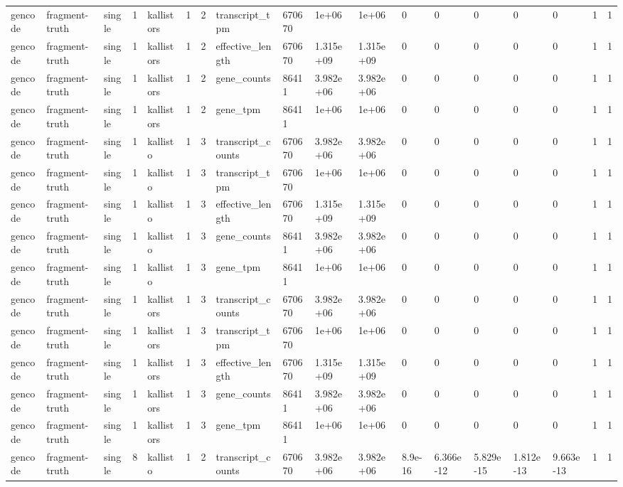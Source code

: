 \begin{tabular}{llllllllllllllllll}
gencode & fragment-truth & single & 1 & kallistors & 1 & 2 & transcript\_tpm & 670670 & 1e+06 & 1e+06 & 0 & 0 & 0 & 0 & 0 & 1 & 1 \\
gencode & fragment-truth & single & 1 & kallistors & 1 & 2 & effective\_length & 670670 & 1.315e+09 & 1.315e+09 & 0 & 0 & 0 & 0 & 0 & 1 & 1 \\
gencode & fragment-truth & single & 1 & kallistors & 1 & 2 & gene\_counts & 86411 & 3.982e+06 & 3.982e+06 & 0 & 0 & 0 & 0 & 0 & 1 & 1 \\
gencode & fragment-truth & single & 1 & kallistors & 1 & 2 & gene\_tpm & 86411 & 1e+06 & 1e+06 & 0 & 0 & 0 & 0 & 0 & 1 & 1 \\
gencode & fragment-truth & single & 1 & kallisto & 1 & 3 & transcript\_counts & 670670 & 3.982e+06 & 3.982e+06 & 0 & 0 & 0 & 0 & 0 & 1 & 1 \\
gencode & fragment-truth & single & 1 & kallisto & 1 & 3 & transcript\_tpm & 670670 & 1e+06 & 1e+06 & 0 & 0 & 0 & 0 & 0 & 1 & 1 \\
gencode & fragment-truth & single & 1 & kallisto & 1 & 3 & effective\_length & 670670 & 1.315e+09 & 1.315e+09 & 0 & 0 & 0 & 0 & 0 & 1 & 1 \\
gencode & fragment-truth & single & 1 & kallisto & 1 & 3 & gene\_counts & 86411 & 3.982e+06 & 3.982e+06 & 0 & 0 & 0 & 0 & 0 & 1 & 1 \\
gencode & fragment-truth & single & 1 & kallisto & 1 & 3 & gene\_tpm & 86411 & 1e+06 & 1e+06 & 0 & 0 & 0 & 0 & 0 & 1 & 1 \\
gencode & fragment-truth & single & 1 & kallistors & 1 & 3 & transcript\_counts & 670670 & 3.982e+06 & 3.982e+06 & 0 & 0 & 0 & 0 & 0 & 1 & 1 \\
gencode & fragment-truth & single & 1 & kallistors & 1 & 3 & transcript\_tpm & 670670 & 1e+06 & 1e+06 & 0 & 0 & 0 & 0 & 0 & 1 & 1 \\
gencode & fragment-truth & single & 1 & kallistors & 1 & 3 & effective\_length & 670670 & 1.315e+09 & 1.315e+09 & 0 & 0 & 0 & 0 & 0 & 1 & 1 \\
gencode & fragment-truth & single & 1 & kallistors & 1 & 3 & gene\_counts & 86411 & 3.982e+06 & 3.982e+06 & 0 & 0 & 0 & 0 & 0 & 1 & 1 \\
gencode & fragment-truth & single & 1 & kallistors & 1 & 3 & gene\_tpm & 86411 & 1e+06 & 1e+06 & 0 & 0 & 0 & 0 & 0 & 1 & 1 \\
gencode & fragment-truth & single & 8 & kallisto & 1 & 2 & transcript\_counts & 670670 & 3.982e+06 & 3.982e+06 & 8.9e-16 & 6.366e-12 & 5.829e-15 & 1.812e-13 & 9.663e-13 & 1 & 1 \\

\end{tabular}
